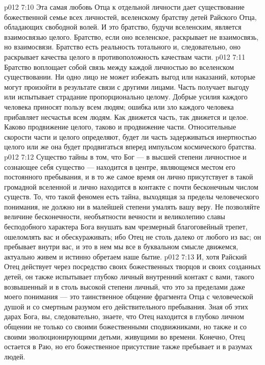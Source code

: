 \vs p012 7:10 Эта самая любовь Отца к отдельной личности дает существование божественной семье всех личностей, вселенскому братству детей Райского Отца, обладающих свободной волей. И это братство, будучи вселенским, является взаимосвязью целого. Братство, если оно вселенское, раскрывает не  взаимосвязь, но  взаимосвязи. Братство есть реальность тотального и, следовательно, оно раскрывает качества целого в противоположность качествам части.
\vs p012 7:11 Братство воплощает собой связь между каждой личностью во вселенском существовании. Ни одно лицо не может избежать выгод или наказаний, которые могут произойти в результате связи с другими лицами. Часть получает выгоду или испытывает страдание пропорционально целому. Добрые усилия каждого человека приносят пользу всем людям; ошибка или зло каждого человека прибавляет несчастья всем людям. Как движется часть, так движется и целое. Каково продвижение целого, таково и продвижение части. Относительные скорости части и целого определяют, будет ли часть задерживаться инертностью целого или же она будет продвигаться вперед импульсом космического братства.
\vs p012 7:12 \pc Существо тайны в том, что Бог --- в высшей степени личностное и сознающее себя существо --- находится в центре, являющемся местом его постоянного пребывания, и в то же самое время он лично присутствует в такой громадной вселенной и лично находится в контакте с почти бесконечным числом существ. То, что такой феномен есть тайна, выходящая за пределы человеческого понимания, не должно ни в малейшей степени умалять вашу веру. Не позволяйте величине бесконечности, необъятности вечности и великолепию славы бесподобного характера Бога внушать вам чрезмерный благоговейный трепет, ошеломлять вас и обескураживать; ибо Отец не столь далеко от любого из вас; он пребывает внутри вас, и это в нем мы все в буквальном смысле движемся, актуально живем и истинно обретаем наше бытие.
\vs p012 7:13 \pc И, хотя Райский Отец действует через посредство своих божественных творцов и своих созданных детей, он также испытывает глубоко личный внутренний контакт с вами, такого возвышенный и в столь высокой степени личный, что это за пределами даже моего понимания --- это таинственное общение фрагмента Отца с человеческой душой и со смертным разумом его действительного пребывания. Зная об этих дарах Бога, вы, следовательно, знаете, что Отец находится в глубоко личном общении не только со своими божественными сподвижниками, но также и со своими эволюционирующими детьми, живущими во времени. Конечно, Отец остается в Раю, но его божественное присутствие также пребывает и в разумах людей.
